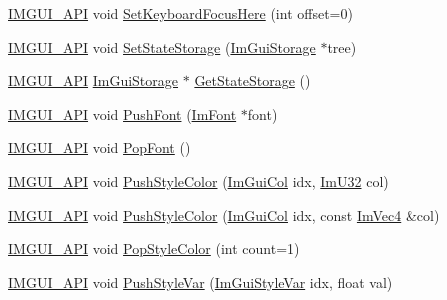 \begin{DoxyCompactItemize}
\item 
\mbox{\hyperlink{imgui_8h_a43829975e84e45d1149597467a14bbf5}{I\+M\+G\+U\+I\+\_\+\+A\+PI}} void \mbox{\hyperlink{namespace_im_gui_ae85e5fba7e88cea8bd3ba5b687c979f2}{Set\+Keyboard\+Focus\+Here}} (int offset=0)
\item 
\mbox{\hyperlink{imgui_8h_a43829975e84e45d1149597467a14bbf5}{I\+M\+G\+U\+I\+\_\+\+A\+PI}} void \mbox{\hyperlink{namespace_im_gui_a635f4511603cc6284d8b21fb8d53090d}{Set\+State\+Storage}} (\mbox{\hyperlink{struct_im_gui_storage}{Im\+Gui\+Storage}} $\ast$tree)
\item 
\mbox{\hyperlink{imgui_8h_a43829975e84e45d1149597467a14bbf5}{I\+M\+G\+U\+I\+\_\+\+A\+PI}} \mbox{\hyperlink{struct_im_gui_storage}{Im\+Gui\+Storage}} $\ast$ \mbox{\hyperlink{namespace_im_gui_aa2b8fa1a5320cd70f23a53d8fe604fb2}{Get\+State\+Storage}} ()
\item 
\mbox{\hyperlink{imgui_8h_a43829975e84e45d1149597467a14bbf5}{I\+M\+G\+U\+I\+\_\+\+A\+PI}} void \mbox{\hyperlink{namespace_im_gui_ac5a59f4f8226fd35786d8973c85b85a9}{Push\+Font}} (\mbox{\hyperlink{struct_im_font}{Im\+Font}} $\ast$font)
\item 
\mbox{\hyperlink{imgui_8h_a43829975e84e45d1149597467a14bbf5}{I\+M\+G\+U\+I\+\_\+\+A\+PI}} void \mbox{\hyperlink{namespace_im_gui_af66649bc37022bf3cf2496c73af9a499}{Pop\+Font}} ()
\item 
\mbox{\hyperlink{imgui_8h_a43829975e84e45d1149597467a14bbf5}{I\+M\+G\+U\+I\+\_\+\+A\+PI}} void \mbox{\hyperlink{namespace_im_gui_a77ee84afb636e05eb4b2d6eeddcc2aa8}{Push\+Style\+Color}} (\mbox{\hyperlink{imgui_8h_a1b0467ec582e731ae6292fef726fb5fe}{Im\+Gui\+Col}} idx, \mbox{\hyperlink{imgui_8h_a118cff4eeb8d00e7d07ce3d6460eed36}{Im\+U32}} col)
\item 
\mbox{\hyperlink{imgui_8h_a43829975e84e45d1149597467a14bbf5}{I\+M\+G\+U\+I\+\_\+\+A\+PI}} void \mbox{\hyperlink{namespace_im_gui_a5bd052ebf55015312a53739974950e7b}{Push\+Style\+Color}} (\mbox{\hyperlink{imgui_8h_a1b0467ec582e731ae6292fef726fb5fe}{Im\+Gui\+Col}} idx, const \mbox{\hyperlink{struct_im_vec4}{Im\+Vec4}} \&col)
\item 
\mbox{\hyperlink{imgui_8h_a43829975e84e45d1149597467a14bbf5}{I\+M\+G\+U\+I\+\_\+\+A\+PI}} void \mbox{\hyperlink{namespace_im_gui_a9795f730b4043a98b6254738d86efcdc}{Pop\+Style\+Color}} (int count=1)
\item 
\mbox{\hyperlink{imgui_8h_a43829975e84e45d1149597467a14bbf5}{I\+M\+G\+U\+I\+\_\+\+A\+PI}} void \mbox{\hyperlink{namespace_im_gui_aab3f43009094462cf2a5eb554785949b}{Push\+Style\+Var}} (\mbox{\hyperlink{imgui_8h_ac919acabce24faae590e295b424874ca}{Im\+Gui\+Style\+Var}} idx, float val)

\end{DoxyCompactItemize}
